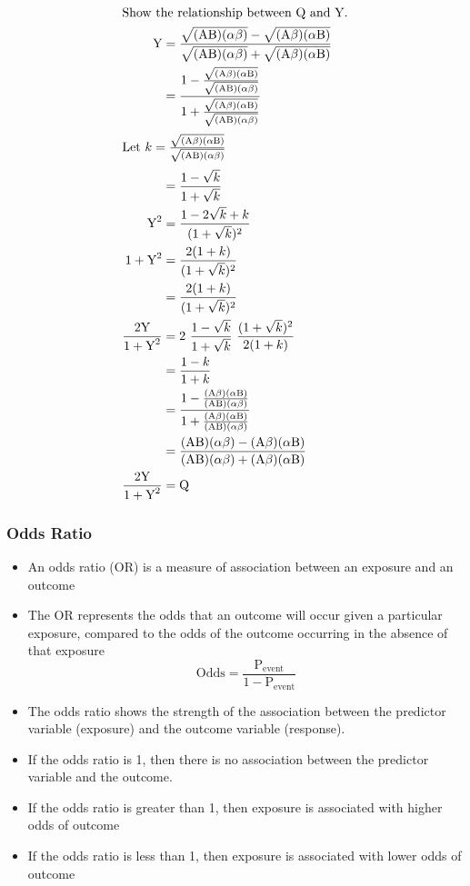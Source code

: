 \documentclass[
10pt, %
a4paper, %
]{report}
\begin{document}
\begin{align*}
\intertext{Show the relationship between Q and Y.}
\text{Y} &= \frac{\sqrt{(\text{AB})(\alpha\beta)} - \sqrt{(\text{A}\beta)(\alpha \text{B})}}{\sqrt{(\text{AB})(\alpha\beta)} + \sqrt{(\text{A}\beta)(\alpha \text{B})}} \\
&= \frac{1 - \frac{\sqrt{(\text{A}\beta)(\alpha \text{B})}}{\sqrt{(\text{AB})(\alpha\beta)}}}{1 + \frac{\sqrt{(\text{A}\beta)(\alpha \text{B})}}{\sqrt{(\text{AB})(\alpha\beta)}}} \\
\intertext{Let \(k = \frac{\sqrt{(\text{A}\beta)(\alpha \text{B})}}{\sqrt{(\text{AB})(\alpha\beta)}}\)}
&= \frac{1-\sqrt{k}}{1+\sqrt{k}} \\
\text{Y}^2 &= \frac{1-2\sqrt{k}+k}{(1+\sqrt{k})^2} \\
1+\text{Y}^2 &= \frac{2(1+k)}{(1+\sqrt{k})^2} \\
&= \frac{2(1+k)}{(1+\sqrt{k})^2} \\
\frac{2\text{Y}}{1+\text{Y}^2} &= 2 \ \frac{1-\sqrt{k}}{1+\sqrt{k}} \ \frac{(1+\sqrt{k})^2}{2(1+k)} \\
&= \frac{1-k}{1+k} \\
&= \frac{1 - \frac{(\text{A}\beta)(\alpha \text{B})}{(\text{AB})(\alpha\beta)}}{1 + \frac{(\text{A}\beta)(\alpha \text{B})}{(\text{AB})(\alpha\beta)}} \\
&= \frac{(\text{AB})(\alpha\beta) - (\text{A}\beta)(\alpha \text{B})}{(\text{AB})(\alpha\beta) + (\text{A}\beta)(\alpha \text{B})} \\
\frac{2\text{Y}}{1+\text{Y}^2} &= \text{Q}
\end{align*}

\subsubsection*{Odds Ratio}

\begin{itemize}
\item An odds ratio (OR) is a measure of association between an exposure and an outcome
\item The OR represents the odds that an outcome will occur given a particular exposure, compared to the odds of the outcome occurring in the absence of that exposure
\[\text{Odds} = \frac{\text{P}_\text{event}}{1-\text{P}_\text{event}}\]
\item The odds ratio shows the strength of the association between the predictor variable (exposure) and the outcome variable (response).
\item If the odds ratio is 1, then there is no association between the predictor variable and the outcome.
\item If the odds ratio is greater than 1, then exposure is associated with higher odds of outcome
\item If the odds ratio is less than 1, then exposure is associated with lower odds of outcome
\end{itemize}
\end{document}

